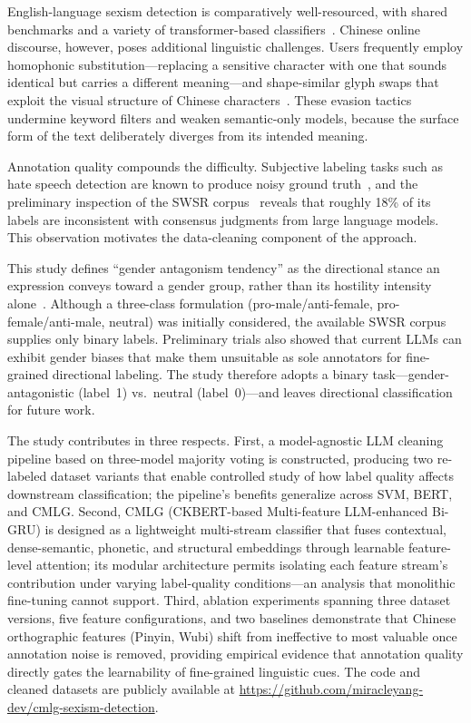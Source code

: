 ﻿\documentclass[12pt]{article}
\begin{document}
English-language sexism detection is comparatively well-resourced, with shared benchmarks and a variety of transformer-based classifiers~\cite{gutam2025feminist,singh2025misogynistic,vivekananda2025integrating,mohasseb2025leveraging,fortuna2018survey,davidson2017offensive}. Chinese online discourse, however, poses additional linguistic challenges. Users frequently employ homophonic substitution---replacing a sensitive character with one that sounds identical but carries a different meaning---and shape-similar glyph swaps that exploit the visual structure of Chinese characters~\cite{ma2024gender}. These evasion tactics undermine keyword filters and weaken semantic-only models, because the surface form of the text deliberately diverges from its intended meaning.

Annotation quality compounds the difficulty. Subjective labeling tasks such as hate speech detection are known to produce noisy ground truth~\cite{frenay2014label,song2023noisy}, and the preliminary inspection of the SWSR corpus~\cite{jiang2022swsr} reveals that roughly 18\% of its labels are inconsistent with consensus judgments from large language models. This observation motivates the data-cleaning component of the approach.

This study defines ``gender antagonism tendency'' as the directional stance an expression conveys toward a gender group, rather than its hostility intensity alone~\cite{qin2024impact}. Although a three-class formulation (pro-male/anti-female, pro-female/anti-male, neutral) was initially considered, the available SWSR corpus supplies only binary labels. Preliminary trials also showed that current LLMs can exhibit gender biases that make them unsuitable as sole annotators for fine-grained directional labeling. The study therefore adopts a binary task---gender-antagonistic (label~1) vs.\ neutral (label~0)---and leaves directional classification for future work.

The study contributes in three respects. First, a model-agnostic LLM cleaning pipeline based on three-model majority voting is constructed, producing two re-labeled dataset variants that enable controlled study of how label quality affects downstream classification; the pipeline's benefits generalize across SVM, BERT, and CMLG. Second, CMLG (CKBERT-based Multi-feature LLM-enhanced Bi-GRU) is designed as a lightweight multi-stream classifier that fuses contextual, dense-semantic, phonetic, and structural embeddings through learnable feature-level attention; its modular architecture permits isolating each feature stream's contribution under varying label-quality conditions---an analysis that monolithic fine-tuning cannot support. Third, ablation experiments spanning three dataset versions, five feature configurations, and two baselines demonstrate that Chinese orthographic features (Pinyin, Wubi) shift from ineffective to most valuable once annotation noise is removed, providing empirical evidence that annotation quality directly gates the learnability of fine-grained linguistic cues. The code and cleaned datasets are publicly available at \url{https://github.com/miracleyang-dev/cmlg-sexism-detection}.
\end{document}
